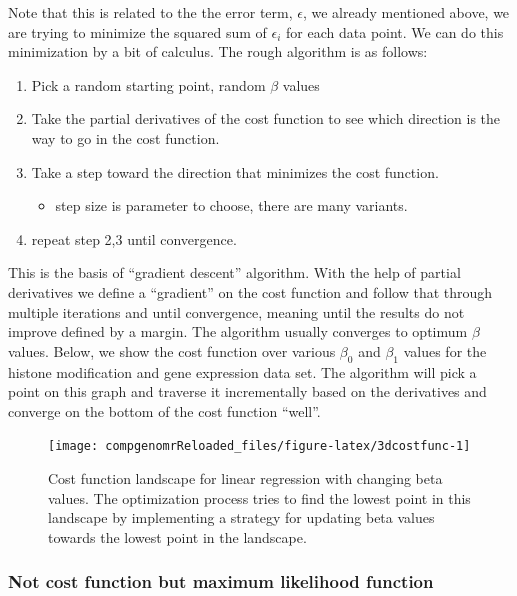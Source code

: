 \documentclass[12pt,]{krantz}
\providecommand{\tightlist}{%
  \setlength{\itemsep}{0pt}\setlength{\parskip}{0pt}}
\theoremstyle{definition}
\theoremstyle{definition}
\theoremstyle{definition}
\theoremstyle{remark}
\begin{document}
Note that this is related to the the error term, \(\epsilon\), we
already mentioned above, we are trying to minimize the squared sum of
\(\epsilon_i\) for each data point. We can do this minimization by a bit
of calculus. The rough algorithm is as follows:

\begin{enumerate}
\def\labelenumi{\arabic{enumi}.}
\tightlist
\item
  Pick a random starting point, random \(\beta\) values
\item
  Take the partial derivatives of the cost function to see which
  direction is the way to go in the cost function.
\item
  Take a step toward the direction that minimizes the cost function.

  \begin{itemize}
  \tightlist
  \item
    step size is parameter to choose, there are many variants.
  \end{itemize}
\item
  repeat step 2,3 until convergence.
\end{enumerate}

This is the basis of ``gradient descent'' algorithm. With the help of
partial derivatives we define a ``gradient'' on the cost function and
follow that through multiple iterations and until convergence, meaning
until the results do not improve defined by a margin. The algorithm
usually converges to optimum \(\beta\) values. Below, we show the cost
function over various \(\beta_0\) and \(\beta_1\) values for the histone
modification and gene expression data set. The algorithm will pick a
point on this graph and traverse it incrementally based on the
derivatives and converge on the bottom of the cost function ``well''.

\begin{figure}

{\centering \texttt{[image: compgenomrReloaded\_files/figure-latex/3dcostfunc-1]} 

}

\caption{Cost function landscape for linear regression with changing beta values. The optimization process tries to find the lowest point in this landscape by implementing a strategy for updating beta values towards the lowest point in the landscape.}\label{fig:3dcostfunc}
\end{figure}

\hypertarget{not-cost-function-but-maximum-likelihood-function}{%
\subsubsection{Not cost function but maximum likelihood
function}\label{not-cost-function-but-maximum-likelihood-function}}
\end{document}

